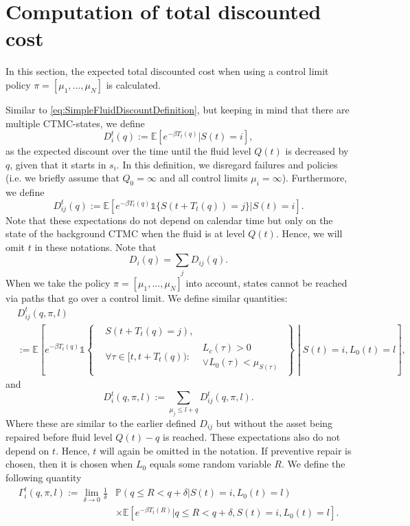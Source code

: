 \section{Computation of total discounted cost}
In this section, the expected total discounted cost when using a control limit policy $\pi=[\mu_1,...,\mu_N]$ is calculated.

Similar to \eqref{eq:SimpleFluidDiscountDefinition}, but keeping in mind that there are multiple CTMC-states, we define
\[
D_{i}^t(q):=\mathbb{E}[e^{-\beta T_t(q)}|S(t)=i],
\]
as the expected discount over the time until the fluid level $Q(t)$ is decreased by $q$, given that it starts in $s_i$.
In this definition, we disregard failures and policies (i.e. we briefly assume that $Q_0=\infty$ and all control limits $\mu_i=\infty$).
Furthermore, we define
\[
D_{ij}^t(q):=\mathbb{E}[e^{-\beta T_t(q)}\mathds{1}\{S(t+T_t(q))=j\}|S(t)=i].
\]
Note that these expectations do not depend on calendar time but only on the state of the background CTMC when the fluid is at level $Q(t)$.
Hence, we will omit $t$ in these notations.
Note that
\[
D_{i}(q)=\sum\limits_{j}D_{ij}(q).
\]
When we take the policy $\pi=[\mu_1,...,\mu_N]$ into account, states cannot be reached via paths that go over a control limit.
We define similar quantities:
\[
\begin{split}
&D_{ij}^t(q,\pi,l)\\
&:=\mathbb{E}\left[e^{-\beta T_t(q)}\mathds{1}\left\{\begin{split}
&S(t+T_t(q)=j),\\
&\forall \tau\in[t,t+T_t(q)):
\begin{split}
&L_c(\tau)>0\\&\vee L_0(\tau)<\mu_{S(\tau)}
\end{split}
\end{split}\right\}\middle| S(t)=i,L_0(t)=l\right],
\end{split}
\]
and
\[
D_{i}^t(q,\pi,l):=\sum\limits_{\mu_j\leq l+q}D_{ij}^t(q,\pi,l).
\]
Where these are similar to the earlier defined $D_{ij}$ but without the asset being repaired before fluid level $Q(t)-q$ is reached.
These expectations also do not depend on $t$.
Hence, $t$ will again be omitted in the notation.
If preventive repair is chosen, then it is chosen when $L_0$ equals some random variable $R$.
We define the following quantity
\[
\begin{split}
\Gamma_i^t(q,\pi,l):=\lim\limits_{\delta\rightarrow 0}\frac1\delta&\mathbb{P}(q\leq R<q+\delta|S(t)=i,L_0(t)=l)\\
&\times\mathbb{E}[e^{-\beta T_t(R)}|q\leq R<q+\delta,S(t)=i,L_0(t)=l].
\end{split}
\]
